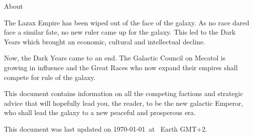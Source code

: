 About

The Lazax Empire has been wiped out of the face of the galaxy. As no race dared face a similar fate, no new ruler came up for the galaxy. This led to the Dark Years which brought an economic, cultural and intellectual decline.

Now, the Dark Years came to an end. The Galactic Council on Mecatol is growing in influence and the Great Races who now expand their empires shall compete for rule of the galaxy.

This document contains information on all the competing factions and strategic advice that will hopefully lead you, the reader, to be the new galactic Emperor, who shall lead the galaxy to a new peaceful and prosperous era.

\vspace{20cm}
\begin{center}
\Large
This document was last updated on \today\ at \currenttime\ Earth GMT+2.
\end{center}